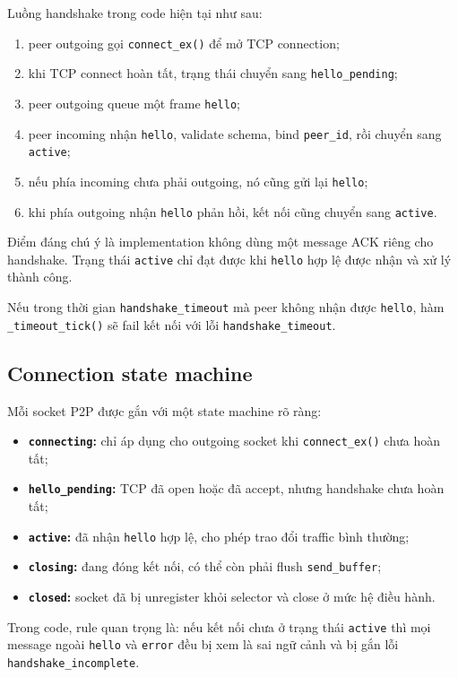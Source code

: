 Luồng handshake trong code hiện tại như sau:
\begin{enumerate}[leftmargin=2em]
    \item peer outgoing gọi \texttt{connect\_ex()} để mở TCP connection;
    \item khi TCP connect hoàn tất, trạng thái chuyển sang \texttt{hello\_pending};
    \item peer outgoing queue một frame \texttt{hello};
    \item peer incoming nhận \texttt{hello}, validate schema, bind \texttt{peer\_id}, rồi chuyển sang \texttt{active};
    \item nếu phía incoming chưa phải outgoing, nó cũng gửi lại \texttt{hello};
    \item khi phía outgoing nhận \texttt{hello} phản hồi, kết nối cũng chuyển sang \texttt{active}.
\end{enumerate}

Điểm đáng chú ý là implementation không dùng một message ACK riêng cho handshake. Trạng thái \texttt{active} chỉ đạt được khi \texttt{hello} hợp lệ được nhận và xử lý thành công.

Nếu trong thời gian \texttt{handshake\_timeout} mà peer không nhận được \texttt{hello}, hàm \texttt{\_timeout\_tick()} sẽ fail kết nối với lỗi \texttt{handshake\_timeout}.

\subsection{Connection state machine}
Mỗi socket P2P được gắn với một state machine rõ ràng:
\begin{itemize}[leftmargin=2em]
    \item \textbf{\texttt{connecting}:} chỉ áp dụng cho outgoing socket khi \texttt{connect\_ex()} chưa hoàn tất;
    \item \textbf{\texttt{hello\_pending}:} TCP đã open hoặc đã accept, nhưng handshake chưa hoàn tất;
    \item \textbf{\texttt{active}:} đã nhận \texttt{hello} hợp lệ, cho phép trao đổi traffic bình thường;
    \item \textbf{\texttt{closing}:} đang đóng kết nối, có thể còn phải flush \texttt{send\_buffer};
    \item \textbf{\texttt{closed}:} socket đã bị unregister khỏi selector và close ở mức hệ điều hành.
\end{itemize}

Trong code, rule quan trọng là: nếu kết nối chưa ở trạng thái \texttt{active} thì mọi message ngoài \texttt{hello} và \texttt{error} đều bị xem là sai ngữ cảnh và bị gắn lỗi \texttt{handshake\_incomplete}.

